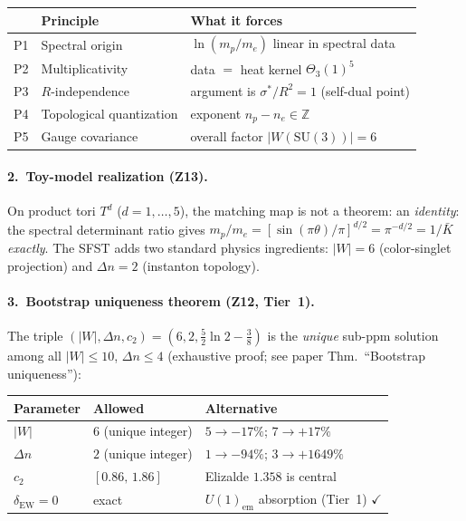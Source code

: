 \documentclass[11pt,a4paper]{article}
\begin{document}
\begin{center}
\renewcommand{\arraystretch}{1.15}\small
\begin{tabular}{clp{6.8cm}}
\toprule
& \textbf{Principle} & \textbf{What it forces}\\
\midrule
P1 & Spectral origin & $\ln(m_p/m_e)$ linear in spectral data\\
P2 & Multiplicativity & data $=$ heat kernel $\Theta_3(1)^5$\\
P3 & $R$-independence & argument is $\sigma^*/R^2=1$ (self-dual point)\\
P4 & Topological quantization & exponent $n_p-n_e\in\mathbb{Z}$\\
P5 & Gauge covariance & overall factor $|W(\mathrm{SU}(3))|=6$\\
\bottomrule
\end{tabular}
\end{center}

\paragraph{2.\ Toy-model realization (Z13).}
On product tori $T^d$ ($d=1,\ldots,5$), the matching map is not a
theorem: an \emph{identity}: the spectral determinant ratio
gives $m_p/m_e = [\sin(\pi\theta)/\pi]^{d/2} = \pi^{-d/2} = 1/\bar K$
\emph{exactly}. The SFST adds two standard physics ingredients:
$|W|=6$ (color-singlet projection) and $\Delta n=2$ (instanton topology).

\paragraph{3.\ Bootstrap uniqueness theorem (Z12, Tier~1).}
The triple $(|W|,\Delta n, c_2)=(6,2,\tfrac52\ln 2-\tfrac38)$ is the
\emph{unique} sub-ppm solution among all $|W|\leq 10$, $\Delta n\leq 4$
(exhaustive proof; see paper Thm.\ ``Bootstrap uniqueness''):

\begin{center}
\renewcommand{\arraystretch}{1.1}\small
\begin{tabular}{lll}
\toprule
\textbf{Parameter} & \textbf{Allowed} & \textbf{Alternative}\\
\midrule
$|W|$ & $6$ (unique integer) & $5\to -17\%$; $7\to +17\%$\\
$\Delta n$ & $2$ (unique integer) & $1\to -94\%$; $3\to +1649\%$\\
$c_2$ & $[0.86,\,1.86]$ & Elizalde $1.358$ is central\\
$\delta_{\mathrm{EW}}=0$ & exact & $U(1)_{\mathrm{em}}$ absorption (Tier~1) $\checkmark$\\
\bottomrule
\end{tabular}
\end{center}
\end{document}

